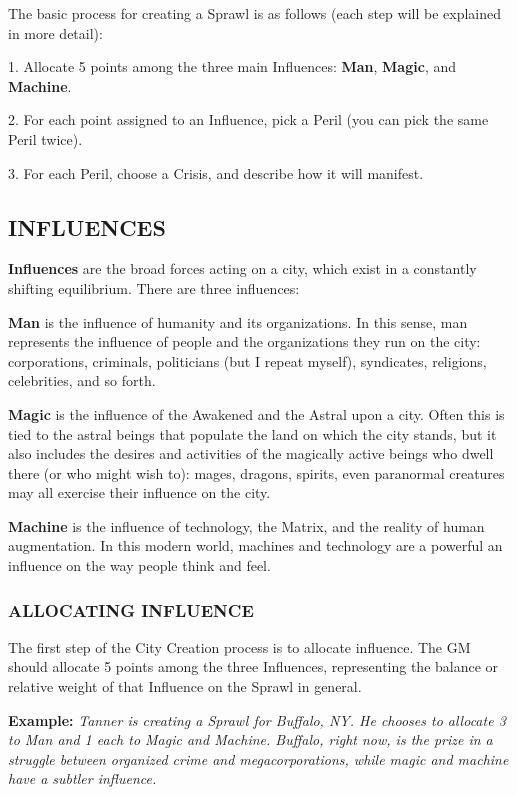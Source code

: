 \documentclass[oneside,10pt]{article}
\begin{document}
\begin{multicols}{2}
The basic process for creating a Sprawl is as follows (each step
will be explained in more detail):
\begin{adjustwidth*}{.5cm}{.5cm}
1.	Allocate 5 points among the three main Influences:
\textbf{Man}, \textbf{Magic}, and \textbf{Machine}.

2.	For each point assigned to an Influence, pick a Peril (you
can pick the same Peril twice).

3.	For each Peril, choose a Crisis, and describe how it will
manifest.
\end{adjustwidth*}

\subsection{INFLUENCES}
\textbf{Influences} are the broad forces acting on a city, which exist
in a constantly shifting equilibrium. There are three influences:

\textbf{Man} is the influence of humanity and its organizations. In
this sense, man represents the influence of people and the
organizations they run on the city: corporations, criminals,
politicians (but I repeat myself), syndicates, religions, celebrities, and so forth.

\textbf{Magic} is the influence of the Awakened and the Astral upon
a city. Often this is tied to the astral beings that populate the
land on which the city stands, but it also includes the desires
and activities of the magically active beings who dwell there
(or who might wish to): mages, dragons, spirits, even paranormal creatures may all exercise their influence on the city.

\textbf{Machine} is the influence of technology, the Matrix, and the
reality of human augmentation. In this modern world, machines and technology are a powerful an influence on the way
people think and feel.

\subsubsection{ALLOCATING INFLUENCE}
The first step of the City Creation process is to allocate influence. The GM should allocate 5 points among the three
Influences, representing the balance or relative weight of that
Influence on the Sprawl in general.
\begin{adjustwidth*}{.5cm}{.5cm}
\textbf{Example:} \textit{Tanner is creating a Sprawl for Buffalo, NY. He
chooses to allocate 3 to Man and 1 each to Magic and Machine. Buffalo, right now, is the prize in a struggle between
organized crime and megacorporations, while magic and
machine have a subtler influence.}
\end{adjustwidth*}

\end{multicols}
\end{document}
